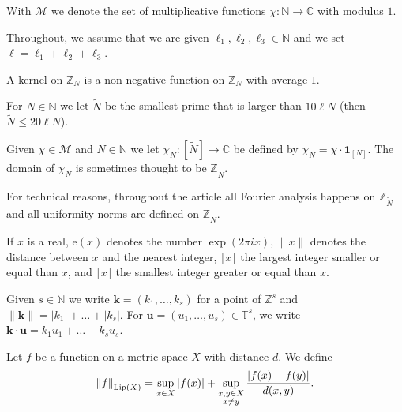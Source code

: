 \documentclass[11pt]{amsart}
\theoremstyle{definition}
\begin{document}
\smallskip

\noindent With ${{\mathcal M}}$ we denote the set of multiplicative functions
$\chi\colon {{\mathbb N}}\to {{\mathbb C}}$ with modulus $1$.

\smallskip

\noindent Throughout, we assume that we are given
$\ell_1,\ell_2,\ell_3\in {{\mathbb N}}$ and we set $\ell=\ell_1+\ell_2+\ell_3$.

\smallskip
\noindent A  kernel on ${{\mathbb Z}}_N$  is a non-negative function on ${{\mathbb Z}}_N$
with average $1$.

\smallskip

\noindent For  $N\in {{\mathbb N}}$ we let ${{\widetilde N}}$ be the smallest prime that is
larger than $10\ell N$ (then ${{\widetilde N}}\leq 20 \ell N$).

\smallskip

\noindent Given $\chi\in {{\mathcal M}}$ and $N\in {{\mathbb N}}$ we let $\chi_N\colon
[{{\widetilde N}}]\to {{\mathbb C}}$ be defined by $\chi_N=\chi \cdot {\mathbf{1}}_{[N]} $. The domain
of $\chi_N$ is sometimes  thought to be ${{\mathbb Z}}_{{\widetilde N}}$.

\smallskip  \noindent For technical reasons, throughout the
article all Fourier analysis happens on ${{\mathbb Z}}_{{\widetilde N}}$   and all
uniformity norms are defined on ${{\mathbb Z}}_{{\widetilde N}}$.

\smallskip
\noindent If $x$ is a real, ${\mathrm{e}}(x)$ denotes the number $\exp(2\pi i
x)$, ${\lVert x \rVert}$ denotes the distance between $x$ and the nearest
integer, $\lfloor x\rfloor$ the largest integer smaller or equal than $x$,
and $\lceil x\rceil$ the smallest integer greater or equal than $x$.

\smallskip

\noindent Given $s\in {{\mathbb N}}$ we write ${{\mathbf{k}}}=(k_1,\dots,k_s)$ for a point
of ${{\mathbb Z}}^s$ and ${\lVert {{\mathbf{k}}} \rVert}=|k_1|+\dots+|k_s|$. For
${{\mathbf{u}}}=(u_1,\dots,u_s)\in{{\mathbb T}}^s$, we write
${{\mathbf{k}}}\cdot{{\mathbf{u}}}=k_1u_1+\dots+k_su_s$.

\smallskip

\noindent Let $f$ be a  function on a metric space $X$ with distance
$d$. We define
$$
{\lVert f \rVert}_{{{\text{\rm Lip}}}(X)}=\sup_{x\in X}|f(x)|+\sup_{\substack{x,y\in X\\
x\neq y}}\frac{|f(x)-f(y)|}{d(x,y)}.
$$

\smallskip
\end{document}
